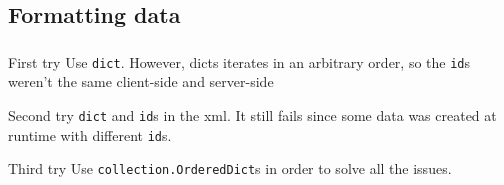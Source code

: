 \documentclass[a4paper, 11pt]{beamer}
\begin{document}
\subsection{Formatting data}

\begin{frame}[fragile]
    \frametitle{\subsecname}
    \begin{alertblock}{First try}
        Use \verb|dict|. However, dicts iterates in an arbitrary order,
        so the \verb|id|s weren't the same client-side and server-side
    \end{alertblock}

    \pause

    \begin{alertblock}{Second try}
        \verb|dict| and \verb|id|s in the xml. It still fails
        since some data was created at runtime with different \verb|id|s.
    \end{alertblock}

    \pause

    \begin{block}{Third try}
        Use \verb|collection.OrderedDict|s in order to solve
        all the issues.
    \end{block}
\end{frame}
\end{document}
